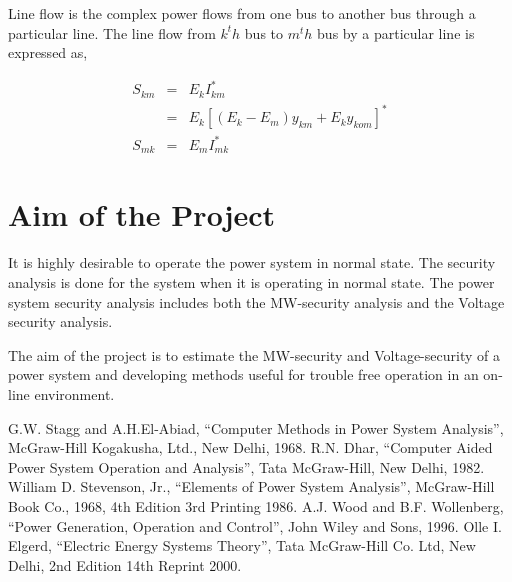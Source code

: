 \documentclass[a4paper,11pt]{article}
\begin{document}
Line flow is the complex power flows from one bus to another bus through a particular line. The line flow from $k^th$ bus to $m^th$ bus by a particular line is expressed as,

\begin{eqnarray}
S_{km} &=& E_{k}I_{km}^{\ast} \nonumber \\
	&=& E_{k}[(E_{k} - E_{m})y_{km} + E_{k}y_{kom}]^{\ast} \\
S_{mk} &=& E_{m}I_{mk}^{\ast} \nonumber 
\end{eqnarray}

\section{Aim of the Project}

It is highly desirable to operate the power system in normal state. The security analysis is done for the system when it is operating in normal state. The power system security analysis includes both the MW-security analysis and the Voltage security analysis.

The aim of the project is to estimate the MW-security and Voltage-security of a power system and developing methods useful for trouble free operation in an on-line environment.

\clearpage

\begin{thebibliography}{99}
 G.W. Stagg and A.H.El-Abiad, ``Computer Methods in Power System Analysis'', McGraw-Hill Kogakusha, Ltd., New Delhi, 1968.
 R.N. Dhar, ``Computer Aided Power System Operation and Analysis'', Tata McGraw-Hill, New Delhi, 1982.
 William D. Stevenson, Jr., ``Elements of Power System Analysis'', McGraw-Hill Book Co., 1968, 4th Edition 3rd Printing 1986.
 A.J. Wood and B.F. Wollenberg, ``Power Generation, Operation and Control'', John Wiley and Sons, 1996.
 Olle I. Elgerd, ``Electric Energy Systems Theory'', Tata McGraw-Hill Co. Ltd, New Delhi, 2nd Edition 14th Reprint 2000.
\end{thebibliography}
\end{document}
